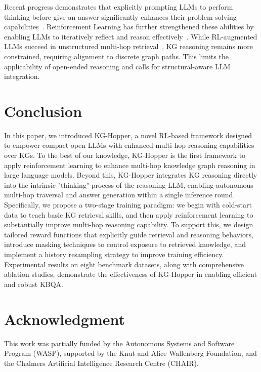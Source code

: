\documentclass[10pt,conference]{IEEEtran}
\begin{document}

Recent progress demonstrates that explicitly prompting LLMs to perform thinking before give an answer significantly enhances their problem-solving capabilities~\cite{wei2022chain, li2025system}. Reinforcement Learning has further strengthened these abilities by enabling LLMs to iteratively reflect and reason effectively~\cite{wang2024math, zhu2025chain}. While RL-augmented LLMs succeed in unstructured multi-hop retrieval~\cite{li2025webthinker}, KG reasoning remains more constrained, requiring alignment to discrete graph paths. This limits the applicability of open-ended reasoning and calls for structural-aware LLM integration.


\section{Conclusion}
In this paper, we introduced KG-Hopper, a novel RL-based framework designed to empower compact open LLMs with enhanced multi-hop reasoning capabilities over KGs. To the best of our knowledge, KG-Hopper is the first framework to apply reinforcement learning to enhance multi-hop knowledge graph reasoning in large language models. Beyond this, KG-Hopper integrates KG reasoning directly into the intrinsic "thinking" process of the reasoning LLM, enabling autonomous multi-hop traversal and answer generation within a single inference round. Specifically, we propose a two-stage training paradigm: we begin with cold-start data to teach basic KG retrieval skills, and then apply reinforcement learning to substantially improve multi-hop reasoning capability. To support this, we design tailored reward functions that explicitly guide retrieval and reasoning behaviors, introduce masking techniques to control exposure to retrieved knowledge, and implement a history resampling strategy to improve training efficiency. Experimental results on eight benchmark datasets, along with comprehensive ablation studies, demonstrate the effectiveness of KG-Hopper in enabling efficient and robust KBQA.

\section*{Acknowledgment}
This work was partially funded by the Autonomous Systems and Software Program (WASP), supported by the Knut and Alice Wallenberg Foundation, and the Chalmers Artificial Intelligence Research Centre (CHAIR).

\balance


\end{document}
